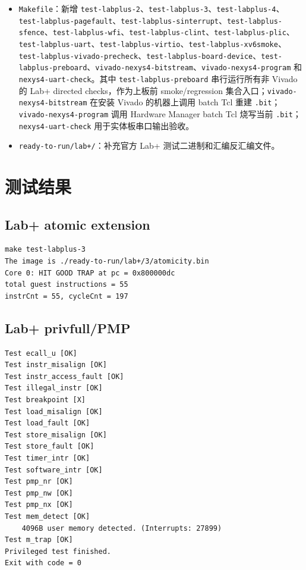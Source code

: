 \documentclass[UTF8,a4paper,11pt]{ctexart}
\begin{document}
\begin{itemize}
  \item \texttt{Makefile}：新增 \texttt{test-labplus-2}、\texttt{test-labplus-3}、\texttt{test-labplus-4}、\texttt{test-labplus-pagefault}、\texttt{test-labplus-sinterrupt}、\texttt{test-labplus-sfence}、\texttt{test-labplus-wfi}、\texttt{test-labplus-clint}、\texttt{test-labplus-plic}、\texttt{test-labplus-uart}、\texttt{test-labplus-virtio}、\texttt{test-labplus-xv6smoke}、\texttt{test-labplus-vivado-precheck}、\texttt{test-labplus-board-device}、\texttt{test-labplus-preboard}、\texttt{vivado-nexys4-bitstream}、\texttt{vivado-nexys4-program} 和 \texttt{nexys4-uart-check}。其中 \texttt{test-labplus-preboard} 串行运行所有非 Vivado 的 Lab+ directed checks，作为上板前 smoke/regression 集合入口；\texttt{vivado-nexys4-bitstream} 在安装 Vivado 的机器上调用 batch Tcl 重建 \texttt{.bit}；\texttt{vivado-nexys4-program} 调用 Hardware Manager batch Tcl 烧写当前 \texttt{.bit}；\texttt{nexys4-uart-check} 用于实体板串口输出验收。
  \item \texttt{ready-to-run/lab+/}：补充官方 Lab+ 测试二进制和汇编反汇编文件。
\end{itemize}

\section{测试结果}

\subsection{Lab+ atomic extension}

\begin{Verbatim}[fontsize=\small]
make test-labplus-3
The image is ./ready-to-run/lab+/3/atomicity.bin
Core 0: HIT GOOD TRAP at pc = 0x800000dc
total guest instructions = 55
instrCnt = 55, cycleCnt = 197
\end{Verbatim}

\subsection{Lab+ privfull/PMP}

\begin{Verbatim}[fontsize=\small]
Test ecall_u [OK]
Test instr_misalign [OK]
Test instr_access_fault [OK]
Test illegal_instr [OK]
Test breakpoint [X]
Test load_misalign [OK]
Test load_fault [OK]
Test store_misalign [OK]
Test store_fault [OK]
Test timer_intr [OK]
Test software_intr [OK]
Test pmp_nr [OK]
Test pmp_nw [OK]
Test pmp_nx [OK]
Test mem_detect [OK]
    4096B user memory detected. (Interrupts: 27899)
Test m_trap [OK]
Privileged test finished.
Exit with code = 0
\end{Verbatim}
\end{document}
